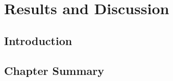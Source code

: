 \chapter{Results and Discussion}
\label{ch:results}

\section{Introduction}

\section{Chapter Summary}
